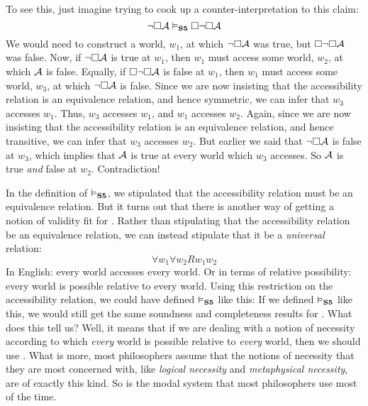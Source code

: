 To see this, just imagine trying to cook up a counter-interpretation to this claim:
\[
	\neg\Box\mathcal{A} \vDash_{\mathbf{S5}}  \Box \neg\Box \mathcal{A}
\]
We would need to construct a world, $w_1$, at which $\neg\Box\mathcal{A}$ was true, but $\Box \neg\Box \mathcal{A}$ was false.
Now, if $\neg\Box\mathcal{A}$ is true at $w_1$, then $w_1$ must access some world, $w_2$, at which $\mathcal{A}$ is false. Equally, if $\Box \neg\Box \mathcal{A}$ is false at $w_1$, then $w_1$ must access some world, $w_3$, at which $\neg\Box \mathcal{A}$ is false. Since we are now insisting that the accessibility relation is an equivalence relation, and hence symmetric, we can infer that $w_3$ accesses $w_1$. Thus, $w_3$ accesses $w_1$, and $w_1$ accesses $w_2$. Again, since we are now insisting that the accessibility relation is an equivalence relation, and hence transitive, we can infer that $w_3$ accesses $w_2$. But earlier we said that $\neg\Box \mathcal{A}$ is false at $w_3$, which implies that $\mathcal{A}$ is true at every world which $w_3$ accesses. So $\mathcal{A}$ is true \emph{and} false at $w_2$. Contradiction!

In the definition of $\vDash_{\mathbf{S5}} $, we stipulated that the accessibility relation must be an equivalence relation. But it turns out that there is another way of getting a notion of validity fit for \mlSfive. Rather than stipulating that the accessibility relation be an equivalence relation, we can instead stipulate that it be a \emph{universal} relation:
\[\forall w_1\forall w_2Rw_1w_2\]
In English: every world accesses every world. Or in terms of relative possibility: every world is possible relative to every world. Using this restriction on the accessibility relation, we could have defined $\vDash_{\mathbf{S5}} $ like this:
If we defined $\vDash_{\mathbf{S5}} $ like this, we would still get the same soundness and completeness results for \mlSfive. What does this tell us? Well, it means that if we are dealing with a notion of necessity according to which \emph{every} world is possible relative to \emph{every} world, then we should use \mlSfive. What is more, most philosophers assume that the notions of necessity that they are most concerned with, like \emph{logical necessity} and \emph{metaphysical necessity}, are of exactly this kind. So \mlSfive{} is the modal system that most philosophers use most of the time.

